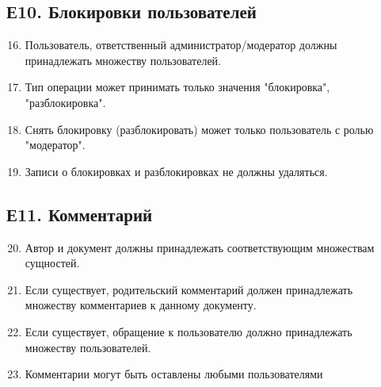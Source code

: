 \subsection*{Е10. Блокировки пользователей}
\begin{enumerate}
\setcounter{enumi}{15}
\item Пользователь, ответственный администратор/модератор должны принадлежать множеству пользователей.
\item Тип операции может принимать только значения "блокировка", "разблокировка".
\item Снять блокировку (разблокировать) может только пользователь с ролью "модератор".
\item Записи о блокировках и разблокировках не должны удаляться.
\end{enumerate}

\subsection*{Е11. Комментарий}
\begin{enumerate}
\setcounter{enumi}{19}
\item Автор и документ должны принадлежать соответствующим множествам сущностей.
\item Если существует, родительский комментарий должен принадлежать множеству комментариев к данному документу.
\item Если существует, обращение к пользователю должно принадлежать множеству пользователей.
\item Комментарии могут быть оставлены любыми пользователями
\end{enumerate}